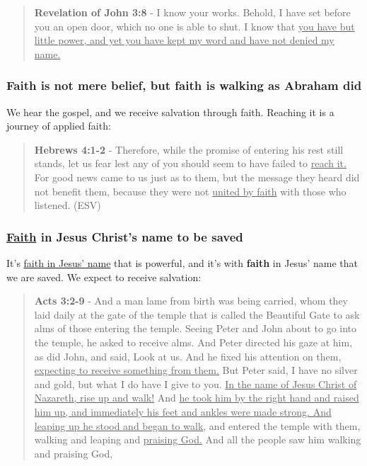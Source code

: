 \documentclass[11pt]{article}
\begin{document}
\begin{quote}
\textbf{Revelation of John 3:8} - I know your works. Behold, I have set before you an open door, which no one is able to shut. I know that \uline{you have but little power, and yet you have kept my word and have not denied my name.}
\end{quote}

\subsubsection{Faith is not mere belief, but faith is walking as Abraham did}
\label{sec:org4a7e311}
We hear the gospel, and we receive salvation through faith. Reaching it is a journey of applied faith:

\begin{quote}
\textbf{Hebrews 4:1-2} - Therefore, while the promise of entering his rest still stands, let us fear lest any of you should seem to have failed to \uline{reach it.} For good news came to us just as to them, but the message they heard did not benefit them, because they were not \uline{united by faith} with those who listened. (ESV)
\end{quote}

\subsubsection{\underline{Faith} in Jesus Christ's name to be saved}
\label{sec:org2802d81}
It's \uline{faith in Jesus' name} that is powerful, and it's with \textbf{faith} in Jesus' name that we are saved. We expect to receive salvation:

\begin{quote}
\textbf{Acts 3:2-9} - And a man lame from birth was being carried, whom they laid daily at the gate of the temple that is called the Beautiful Gate to ask alms of those entering the temple. Seeing Peter and John about to go into the temple, he asked to receive alms. And Peter directed his gaze at him, as did John, and said, Look at us. And he fixed his attention on them, \uline{expecting to receive something from them.} But Peter said, I have no silver and gold, but what I do have I give to you. \uline{In the name of Jesus Christ of Nazareth, rise up and walk!} And \uline{he took him by the right hand and raised him up, and immediately his feet and ankles were made strong. And leaping up he stood and began to walk}, and entered the temple with them, walking and leaping and \uline{praising God.} And all the people saw him walking and praising God,
\end{quote}
\end{document}
